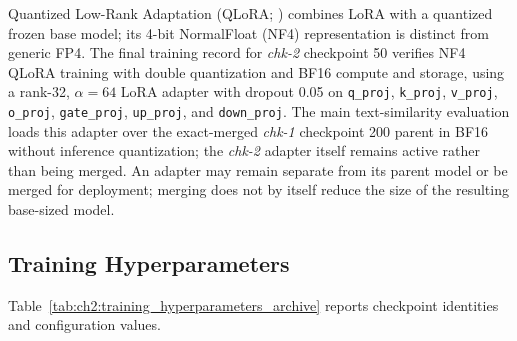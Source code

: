 Quantized Low-Rank Adaptation (QLoRA; \cite{dettmers2024qlora}) combines LoRA
with a quantized frozen base model; its 4-bit NormalFloat (NF4) representation
is distinct from generic FP4. The final training record for \textit{chk-2}
checkpoint 50 verifies NF4 QLoRA training with double quantization and
BF16 compute and storage, using a rank-32, $\alpha=64$ LoRA adapter with
dropout 0.05 on \texttt{q\_proj},
\texttt{k\_proj}, \texttt{v\_proj}, \texttt{o\_proj},
\texttt{gate\_proj}, \texttt{up\_proj}, and \texttt{down\_proj}. The main
text-similarity evaluation loads this adapter over the exact-merged
\textit{chk-1} checkpoint 200 parent in BF16 without inference quantization;
the \textit{chk-2} adapter itself remains active rather than being merged.
An adapter may remain
separate from its parent model or be merged for deployment; merging does not
by itself reduce the size of the resulting base-sized model.




\subsection{Training Hyperparameters}\label{ch2:sec:parameter}

Table~\ref{tab:ch2:training_hyperparameters_archive} reports checkpoint
identities and configuration values. 


